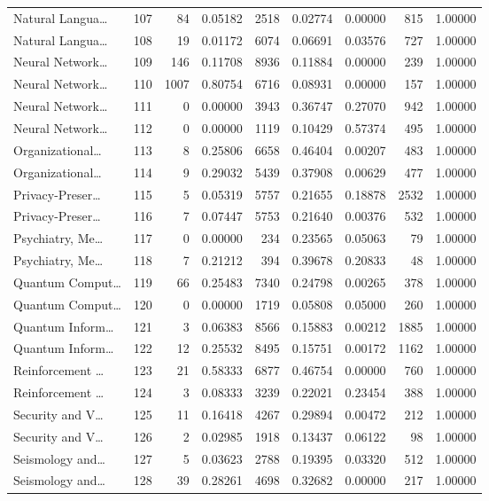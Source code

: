 \begin{table}
\begin{tabular}{lrrrrrrrr}
Natural Langua… & 107 & 84 & 0.05182 & 2518 & 0.02774 & 0.00000 & 815 & 1.00000 \\
Natural Langua… & 108 & 19 & 0.01172 & 6074 & 0.06691 & 0.03576 & 727 & 1.00000 \\
Neural Network… & 109 & 146 & 0.11708 & 8936 & 0.11884 & 0.00000 & 239 & 1.00000 \\
Neural Network… & 110 & 1007 & 0.80754 & 6716 & 0.08931 & 0.00000 & 157 & 1.00000 \\
Neural Network… & 111 & 0 & 0.00000 & 3943 & 0.36747 & 0.27070 & 942 & 1.00000 \\
Neural Network… & 112 & 0 & 0.00000 & 1119 & 0.10429 & 0.57374 & 495 & 1.00000 \\
Organizational… & 113 & 8 & 0.25806 & 6658 & 0.46404 & 0.00207 & 483 & 1.00000 \\
Organizational… & 114 & 9 & 0.29032 & 5439 & 0.37908 & 0.00629 & 477 & 1.00000 \\
Privacy-Preser… & 115 & 5 & 0.05319 & 5757 & 0.21655 & 0.18878 & 2532 & 1.00000 \\
Privacy-Preser… & 116 & 7 & 0.07447 & 5753 & 0.21640 & 0.00376 & 532 & 1.00000 \\
Psychiatry, Me… & 117 & 0 & 0.00000 & 234 & 0.23565 & 0.05063 & 79 & 1.00000 \\
Psychiatry, Me… & 118 & 7 & 0.21212 & 394 & 0.39678 & 0.20833 & 48 & 1.00000 \\
Quantum Comput… & 119 & 66 & 0.25483 & 7340 & 0.24798 & 0.00265 & 378 & 1.00000 \\
Quantum Comput… & 120 & 0 & 0.00000 & 1719 & 0.05808 & 0.05000 & 260 & 1.00000 \\
Quantum Inform… & 121 & 3 & 0.06383 & 8566 & 0.15883 & 0.00212 & 1885 & 1.00000 \\
Quantum Inform… & 122 & 12 & 0.25532 & 8495 & 0.15751 & 0.00172 & 1162 & 1.00000 \\
Reinforcement … & 123 & 21 & 0.58333 & 6877 & 0.46754 & 0.00000 & 760 & 1.00000 \\
Reinforcement … & 124 & 3 & 0.08333 & 3239 & 0.22021 & 0.23454 & 388 & 1.00000 \\
Security and V… & 125 & 11 & 0.16418 & 4267 & 0.29894 & 0.00472 & 212 & 1.00000 \\
Security and V… & 126 & 2 & 0.02985 & 1918 & 0.13437 & 0.06122 & 98 & 1.00000 \\
Seismology and… & 127 & 5 & 0.03623 & 2788 & 0.19395 & 0.03320 & 512 & 1.00000 \\
Seismology and… & 128 & 39 & 0.28261 & 4698 & 0.32682 & 0.00000 & 217 & 1.00000 \\

\end{tabular}
\end{table}
